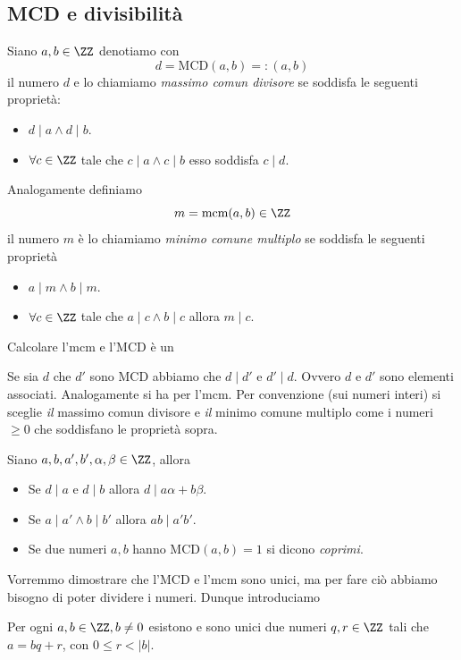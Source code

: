 \documentclass[11pt]{scrartcl}
\begin{document}
	\subsection{MCD e divisibilità}
	\begin{definition}
		Siano $a,b\in\ZZ$ denotiamo con 
		$$d=\text{MCD}(a,b)=:(a,b)$$
		il numero $d$ e lo chiamiamo \textit{massimo comun divisore} se soddisfa le seguenti proprietà:
		\begin{itemize}
			\item $d\mid a \land d\mid b$.
			\item $\forall c\in \ZZ$ tale che $c\mid a\land c\mid b$ esso soddisfa $c\mid d$.
		\end{itemize}
		Analogamente definiamo 
		$$m=\text{mcm}(a,b)\in\ZZ$$ 
		il numero $m$ è lo chiamiamo \textit{minimo comune multiplo} se soddisfa le seguenti proprietà
		\begin{itemize}
			\item $a\mid m \land b\mid m$.
			\item $\forall c\in \ZZ$ tale che $a\mid c\land b\mid c$ allora $m\mid c$.
		\end{itemize}
	\end{definition}
	Calcolare l'mcm e l'MCD è un 
	\begin{proposition}
		Se sia $d$ che $d'$ sono MCD abbiamo che $d\mid d'$ e $d'\mid d$. Ovvero $d$ e $d'$ sono elementi associati. Analogamente si ha per l'mcm. Per convenzione (sui numeri interi) si sceglie \textit{il} massimo comun divisore e \textit{il} minimo comune multiplo come i numeri $\ge 0$ che soddisfano le proprietà sopra.
	\end{proposition}
	\begin{lemma}\label{proprietà della divisibilità}
		Siano $a,b,a',b',\alpha,\beta\in\ZZ$, allora
		\begin{itemize}
			\item Se $d\mid a$ e $d\mid b$ allora $d\mid a\alpha+b\beta$.
			\item Se $a\mid a'\land b\mid b'$ allora $ab\mid a'b'$.
			\item Se due numeri $a,b$ hanno $\text{MCD}(a,b)=1$ si dicono \textit{coprimi}.
		\end{itemize}
	\end{lemma}
	Vorremmo dimostrare che l'MCD e l'mcm sono unici, ma per fare ciò abbiamo bisogno di poter dividere i numeri. Dunque introduciamo
	\begin{theorem}\label{divisione euclidea}
		Per ogni $a,b\in\ZZ,b\ne 0$ esistono e sono unici due numeri $q,r\in\ZZ$ tali che $a=bq+r$, con $0\le r<|b|$.
	\end{theorem}
\end{document}
